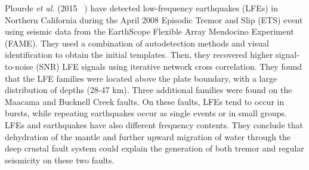 \documentclass[main.tex]{subfiles}
\begin{document}
Plourde \textit{et al.} (2015 ~\cite{PLO_2015}) have detected low-frequency earthquakes (LFEs) in Northern California during the April 2008 Episodic Tremor and Slip (ETS) event using seismic data from the EarthScope Flexible Array Mendocino Experiment (FAME). They used a combination of autodetection methods and visual identification to obtain the initial templates. Then, they recovered higher signal-to-noise (SNR) LFE signals using iterative network cross correlation. They found that the LFE families were located above the plate boundary, with a large distribution of depths (28-47 km). Three additional families were found on the Maacama and Bucknell Creek faults. On these faults, LFEs tend to occur in bursts, while repeating earthquakes occur as single events or in small groups. LFEs and earthquakes have also different frequency contents. They conclude that dehydration of the mantle and further upward migration of water through the deep crustal fault system could explain the generation of both tremor and regular seismicity on these two faults. \\
\end{document}
